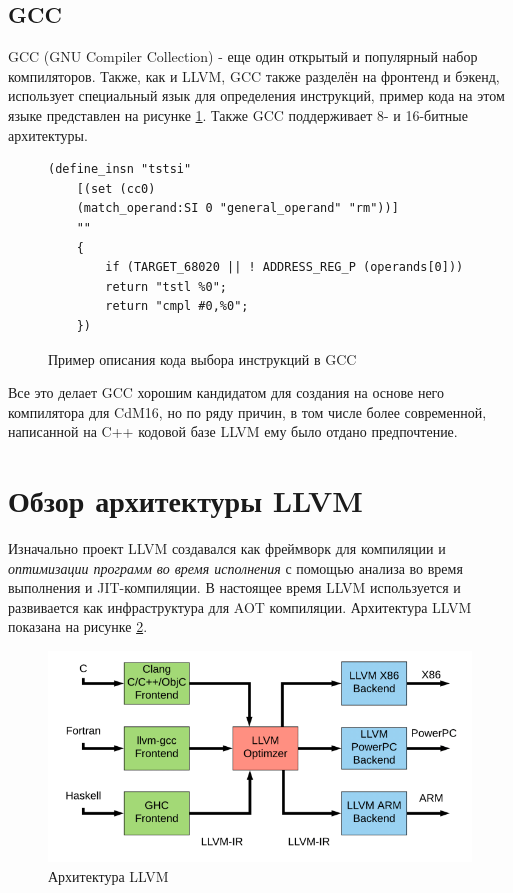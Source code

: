 \documentclass[a4paper,14pt]{extarticle}
\begin{document}
\subsection{GCC}
GCC (GNU Compiler Collection) - еще один открытый и популярный набор компиляторов. Также, как и LLVM, GCC также разделён на фронтенд и бэкенд, использует специальный язык для определения инструкций, пример кода на этом языке представлен на рисунке \ref{gcc-example}. Также GCC поддерживает 8- и 16-битные архитектуры.
\begin{figure}[h!]
	\begin{verbatim}
(define_insn "tstsi"
	[(set (cc0)
	(match_operand:SI 0 "general_operand" "rm"))]
	""
	{
		if (TARGET_68020 || ! ADDRESS_REG_P (operands[0]))
		return "tstl %0";
		return "cmpl #0,%0";
	})
	\end{verbatim}
	\caption{Пример описания кода выбора инструкций в GCC\cite{gcc:codegen}}
	\label{gcc-example}
\end{figure}
Все это делает GCC хорошим кандидатом для создания на основе него компилятора для CdM16, но по ряду причин, в том числе более современной, написанной на C++ кодовой базе LLVM ему было отдано предпочтение.

\pagebreak
\section{Обзор архитектуры LLVM}

Изначально проект LLVM создавался как фреймворк для компиляции и \emph{оптимизации программ во время исполнения} с помощью анализа во время выполнения и JIT-компиляции\cite{LLVM:CGO04}. В настоящее время LLVM используется и развивается как инфраструктура для AOT компиляции. Архитектура LLVM показана на рисунке \ref{llvm-architecture}.
\begin{figure}[!h]
	\begin{center}
		\includegraphics[width=\textwidth]{LLVM-Compiler-Development-architecture.png}
		\caption{Архитектура LLVM \cite{llvmpic}}
		\label{llvm-architecture}
	\end{center}
\end{figure}
\end{document}
